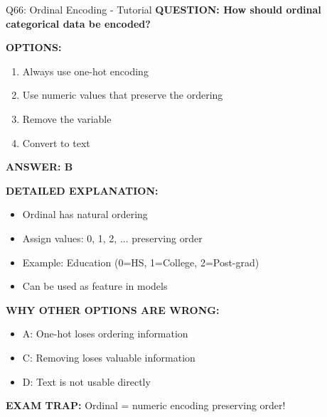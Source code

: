 \documentclass[8pt]{beamer}
\begin{document}
	\begin{frame}{Q66: Ordinal Encoding - Tutorial}
		\fontsize{6.5}{7.5}\selectfont
		\textbf{QUESTION: How should ordinal categorical data be encoded?}
		
		\vspace{0.1cm}
		\textbf{OPTIONS:}
		\begin{enumerate}
			\item Always use one-hot encoding
			\item Use numeric values that preserve the ordering
			\item Remove the variable
			\item Convert to text
		\end{enumerate}
		
		\vspace{0.1cm}
		\textcolor{myblue}{\textbf{ANSWER: B}}
		
		\vspace{0.1cm}
		\textbf{DETAILED EXPLANATION:}
		\begin{itemize}
			\item Ordinal has natural ordering
			\item Assign values: 0, 1, 2, ... preserving order
			\item Example: Education (0=HS, 1=College, 2=Post-grad)
			\item Can be used as feature in models
		\end{itemize}
		
		\vspace{0.1cm}
		\textcolor{myred}{\textbf{WHY OTHER OPTIONS ARE WRONG:}}
		\begin{itemize}
			\item \textcolor{myred}{A:} One-hot loses ordering information
			\item \textcolor{myred}{C:} Removing loses valuable information
			\item \textcolor{myred}{D:} Text is not usable directly
		\end{itemize}
		
		\textcolor{myred}{\textbf{EXAM TRAP:}} Ordinal = \textcolor{myblue}{numeric encoding preserving order}!
	\end{frame}
	
\end{document}
